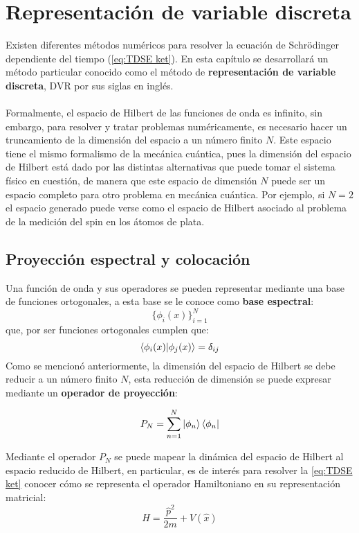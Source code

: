 \chapter{Representación de variable discreta}\label{ch:DVR}
Existen diferentes métodos numéricos para resolver la ecuación de Schrödinger dependiente del tiempo (\autoref{eq:TDSE ket}). En esta capítulo se desarrollará un método particular conocido como el método de \textbf{representación de variable discreta}, \acs{DVR} por sus siglas en inglés.
\\\\
Formalmente, el espacio de Hilbert de las funciones de onda es infinito, sin embargo, para resolver y tratar problemas numéricamente, es necesario hacer un truncamiento de la dimensión del espacio a un número finito $N$. Este espacio tiene el mismo formalismo de la mecánica cuántica, pues la dimensión del espacio de Hilbert está dado por las distintas alternativas que puede tomar el sistema físico en cuestión, de manera que este espacio de dimensión $N$ puede ser un espacio completo para otro problema en mecánica cuántica. Por ejemplo, si $N=2$ el espacio generado puede verse como el espacio de Hilbert asociado al problema de la medición del spin en los átomos de plata. \cite{Gerlach1922}

\section{Proyección espectral y colocación}
Una función de onda y sus operadores se pueden representar mediante una base de funciones ortogonales, a esta base se le conoce como \textbf{base espectral}:
$$\{\phi_i(x)\}_{i=1}^{N}$$
que, por ser funciones ortogonales cumplen que:
$$\bra{\phi_i(x)}\ket{\phi_j(x)} = \delta_{ij}$$
Como se mencionó anteriormente, la dimensión del espacio de Hilbert se debe reducir a un número finito $N$, esta reducción de dimensión se puede expresar mediante un \textbf{operador de proyección}:

\begin{equation}
  \label{eq:operadorproyeccion}
  P_N = \sum_{n=1}^N\ket{\phi_n}\bra{\phi_n}
\end{equation}

Mediante el operador $P_N$ se puede mapear la dinámica del espacio de Hilbert al espacio reducido de Hilbert, en particular, es de interés para resolver la \autoref{eq:TDSE ket} conocer cómo se representa el operador Hamiltoniano en su representación matricial:
\begin{equation}
  \label{eq:Hamiltoniano}
  H = \frac{\hat{p}^2}{2m}+V(\hat{x})
\end{equation}

